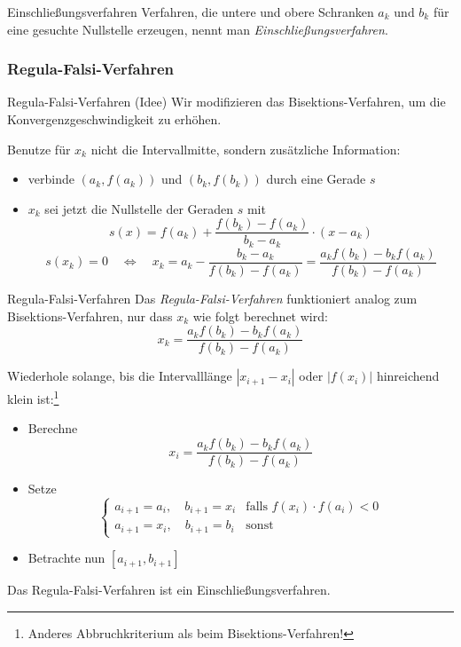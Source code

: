 \begin{defi}{Einschließungsverfahren}
    Verfahren, die untere und obere Schranken $a_k$ und $b_k$ für eine gesuchte Nullstelle erzeugen, nennt man \emph{Einschließungsverfahren}.
\end{defi}

\subsubsection{Regula-Falsi-Verfahren}

\begin{bonus}{Regula-Falsi-Verfahren (Idee)}
    Wir modifizieren das Bisektions-Verfahren, um die Konvergenzgeschwindigkeit zu erhöhen.

    Benutze für $x_k$ nicht die Intervallmitte, sondern zusätzliche Information:
    \begin{itemize}
        \item verbinde $(a_k, f(a_k))$ und $(b_k, f(b_k))$ durch eine Gerade $s$
        \item $x_k$ sei jetzt die Nullstelle der Geraden $s$ mit
              \[
                  s(x) = f(a_k) + \frac{f(b_k) - f(a_k)}{b_k - a_k} \cdot (x - a_k)
              \]
              \[
                  s(x_k) = 0 \quad \iff \quad x_k = a_k - \frac{b_k - a_k}{f(b_k) - f(a_k)} = \frac{a_k f(b_k) - b_k f(a_k)}{f(b_k) - f(a_k)}
              \]
    \end{itemize}
\end{bonus}

\begin{defi}{Regula-Falsi-Verfahren}
    Das \emph{Regula-Falsi-Verfahren} funktioniert analog zum Bisektions-Verfahren, nur dass $x_k$ wie folgt berechnet wird:
    \[
        x_k = \frac{a_k f(b_k) - b_k f(a_k)}{f(b_k) - f(a_k)}
    \]

    Wiederhole solange, bis die Intervalllänge $|x_{i+1} - x_i|$ oder $|f(x_i)|$ hinreichend klein ist:\footnote{Anderes Abbruchkriterium als beim Bisektions-Verfahren!}
    \begin{itemize}
        \item Berechne
              \[
                  x_{i} = \frac{a_k f(b_k) - b_k f(a_k)}{f(b_k) - f(a_k)}
              \]
        \item Setze
              \[
                  \begin{cases}
                      a_{i+1} = a_{i}, \quad b_{i+1} = x_{i} & \text{falls } f(x_{i}) \cdot f(a_{i}) < 0 \\
                      a_{i+1} = x_{i}, \quad b_{i+1} = b_{i} & \text{sonst}
                  \end{cases}
              \]
        \item Betrachte nun $[a_{i+1}, b_{i+1}]$
    \end{itemize}

    Das Regula-Falsi-Verfahren ist ein Einschließungsverfahren.
\end{defi}

